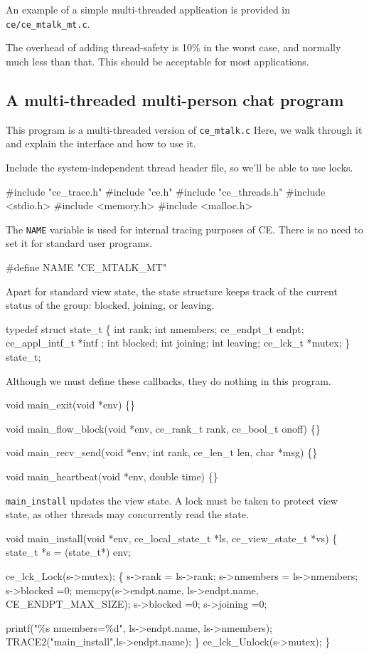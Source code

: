An example of a simple multi-threaded application is provided in {\tt
ce/ce\_mtalk\_mt.c}.

The overhead of adding thread-safety is 10\% in the worst case, and
normally much less than that. This should be acceptable for most 
applications. 

\subsection{A multi-threaded multi-person chat program}
This program is a multi-threaded version of {\tt ce\_mtalk.c}
Here, we walk through it and explain the interface and how to 
use it. 

Include the system-independent thread header file, so we'll be
able to use locks. 
\begin{codebox}
#include "ce_trace.h"
#include "ce.h"
#include "ce_threads.h"
#include <stdio.h>
#include <memory.h>
#include <malloc.h>
\end{codebox}


The {\tt NAME} variable is used for internal tracing purposes of
CE. There is no need to set it for standard user programs.
\begin{codebox}
#define NAME "CE_MTALK_MT"
\end{codebox}


Apart for standard view state, the state structure keeps track
of the current status of the group: blocked, joining, or leaving.
\begin{codebox}
typedef struct state_t \{
    int rank;
    int nmembers;
    ce_endpt_t endpt;
    ce_appl_intf_t *intf ;
    int blocked;
    int joining;
    int leaving;
    ce_lck_t *mutex;
\} state_t;
\end{codebox}

Although we must define these callbacks, they do nothing in this
program.
\begin{codebox}
void main_exit(void *env)
\{\}

void
main_flow_block(void *env, ce_rank_t rank, ce_bool_t onoff)
\{\}

void
main_recv_send(void *env, int rank, ce_len_t len, char *msg)
\{\}

void
main_heartbeat(void *env, double time)
\{\}
\end{codebox}



{\tt main\_install} updates the view state. A lock must be taken to
protect view state, as other threads may concurrently read the state.
\begin{codebox}
void
main_install(void *env, ce_local_state_t *ls, ce_view_state_t *vs)
\{
    state_t *s = (state_t*) env;
    
    ce_lck_Lock(s->mutex); \{
        s->rank = ls->rank;
        s->nmembers = ls->nmembers;
        s->blocked =0;
        memcpy(s->endpt.name, ls->endpt.name, CE\_ENDPT\_MAX\_SIZE);
        s->blocked =0;
        s->joining =0;
	
        printf("\%s nmembers=\%d", ls->endpt.name, ls->nmembers);
        TRACE2("main_install",ls->endpt.name); 
     \} ce_lck_Unlock(s->mutex);
\}
\end{codebox}



